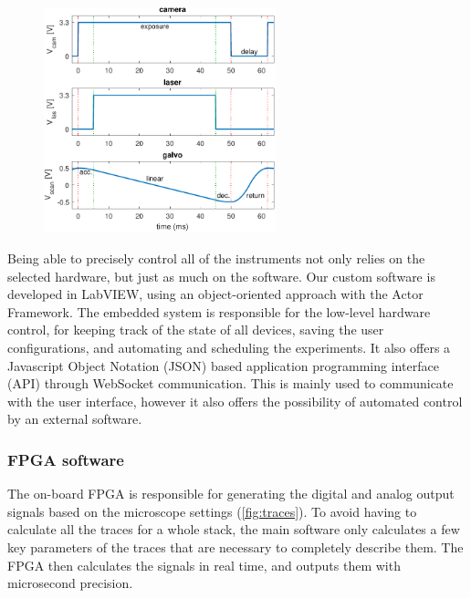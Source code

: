     \begin{figure}
      \centering
      \includegraphics[width = 0.6\textwidth]{fpgaTraces}
      \label{fig:traces}
    \end{figure}

    Being able to precisely control all of the instruments not only relies on the selected hardware, but just as much on the software. Our custom software is developed in LabVIEW, using an object-oriented approach with the Actor Framework. The embedded system is responsible for the low-level hardware control, for keeping track of the state of all devices, saving the user configurations, and automating and scheduling the experiments. It also offers a Javascript Object Notation (JSON) based application programming interface (API) through WebSocket communication. This is mainly used to communicate with the user interface, however it also offers the possibility of automated control by an external software.

    \subsubsection{FPGA software}
      The on-board FPGA is responsible for generating the digital and analog output signals based on the microscope settings (\autoref{fig:traces}). To avoid having to calculate all the traces for a whole stack, the main software only calculates a few key parameters of the traces that are necessary to completely describe them. The FPGA then calculates the signals in real time, and outputs them with microsecond precision.

